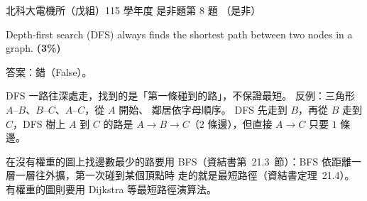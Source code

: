 \begin{pastexam}[label={px:ntut-115-ee-ds-08}]{北科大電機所（戊組）115 學年度 是非題第 8 題}
（是非）

Depth-first search (DFS) always finds the shortest path between two nodes in a graph. \textbf{(3\%)}
\end{pastexam}

\begin{pastsoln}
答案：錯（False）。

DFS 一路往深處走，找到的是「第一條碰到的路」，不保證最短。 反例：三角形 $A$--$B$、$B$--$C$、$A$--$C$，從 $A$ 開始、
鄰居依字母順序。 DFS 先走到 $B$，再從 $B$ 走到 $C$，DFS 樹上 $A$ 到 $C$ 的路是 $A \to B \to C$（$2$ 條邊），但直接
$A \to C$ 只要 $1$ 條邊。

在沒有權重的圖上找邊數最少的路要用 BFS（資結書第~21.3~節）：BFS 依距離一層一層往外擴，第一次碰到某個頂點時
走的就是最短路徑（資結書定理~21.4）。 有權重的圖則要用 Dijkstra 等最短路徑演算法。
\end{pastsoln}

